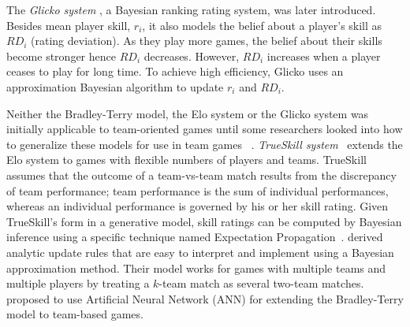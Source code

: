 The \textit{Glicko system} \citep{glickman1999parameter}, a Bayesian ranking rating system, was later introduced. Besides mean player skill, $r_i$, it also models the belief about a player's skill as $RD_i$ (rating deviation). As they play more games, the belief about their skills become stronger hence $RD_i$ decreases. However, $RD_i$ increases when a player ceases to play for long time. To achieve high efficiency, Glicko uses an approximation Bayesian algorithm to update $r_i$ and $RD_i$.

Neither the Bradley-Terry model, the Elo system or the Glicko system was initially applicable to team-oriented games until some researchers looked into how to generalize these models for use in team games ~\citep{herbrich:trueskill,huang2004generalized,menke2008bradley}. \textit{TrueSkill system}~\citep{herbrich:trueskill} extends the Elo system to games with flexible numbers of players and teams. TrueSkill assumes that the outcome of a team-vs-team match results from the discrepancy of team performance; team performance is the sum of individual performances, whereas an individual performance is governed by his or her skill rating. Given TrueSkill's form in a generative model, skill ratings can be computed by Bayesian inference using a specific technique named Expectation Propagation~\citep{minka2001expectation}. \textcite{huang2004generalized} derived analytic update rules that are easy to interpret and implement using a Bayesian approximation
method. Their model works for games with multiple teams and multiple players by treating a $k$-team match as several two-team matches. \textcite{menke2008bradley} proposed to use Artificial Neural Network (ANN) for extending the Bradley-Terry model to team-based games.

